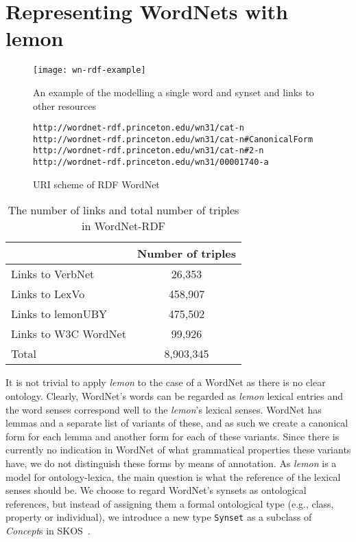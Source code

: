 \documentclass[10pt, a4paper]{article}
\newcommand{\lemon}[0]{\emph{lemon}}
\begin{document}
\section{Representing WordNets with lemon}

\begin{figure}
    \texttt{[image: wn-rdf-example]}
    \caption{An example of the modelling a single word and synset and links to
        other resources\label{modelling_example}}
\end{figure}


\begin{figure*}
\begin{verbatim}
http://wordnet-rdf.princeton.edu/wn31/cat-n
http://wordnet-rdf.princeton.edu/wn31/cat-n#CanonicalForm
http://wordnet-rdf.princeton.edu/wn31/cat-n#2-n
http://wordnet-rdf.princeton.edu/wn31/00001740-a
\end{verbatim}
\caption{URI scheme of RDF WordNet\label{uri-examples}}
\end{figure*}

\begin{table}
  \begin{tabular}{p{50mm}|c}
     & Number of triples \\
    \hline
    Links to VerbNet & 26,353 \\
    Links to LexVo & 458,907 \\
    Links to lemonUBY & 475,502 \\
    Links to W3C WordNet & 99,926 \\
    \hline
    Total & 8,903,345 \\
  \end{tabular}
  \caption{The number of links and total number of triples in
      WordNet-RDF\label{triple_counts}}
\end{table}

It is not trivial to apply \lemon{} to the case of a WordNet as there is no
clear ontology.
Clearly, WordNet's 
words can be regarded as \lemon{} lexical entries and the word senses correspond
well to the \lemon{}'s lexical senses. WordNet has lemmas and a separate list of
variants of these, and as such we create a canonical form for each lemma and another 
form for each of these variants. Since there is currently no indication in
WordNet of what grammatical properties these variants have, we do not distinguish
these forms by means of annotation. As \lemon{} is a model for
ontology-lexica, the main question is what the reference of the lexical senses should be.
We choose to regard WordNet's synsets as ontological references, but instead of assigning them a formal ontological type (e.g.,
class, property or individual), we introduce a new type {\tt Synset} as a subclass of \emph{Concept}s in SKOS~\cite{miles2007skos}.
\end{document}
